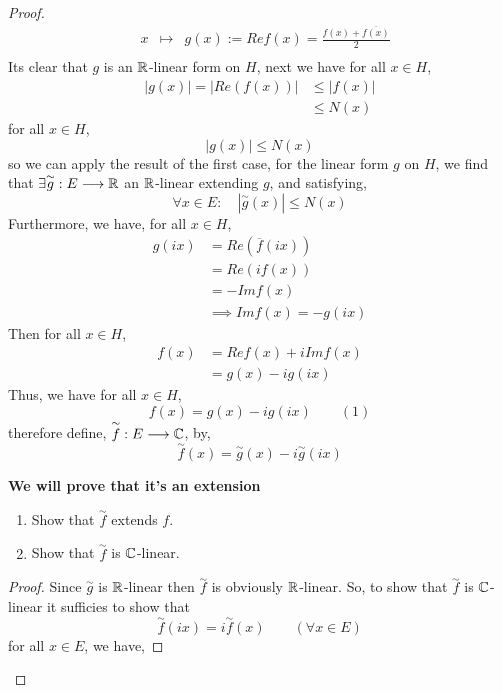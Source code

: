 \begin{proof}
\[\begin{array}{cccc}
           &  x  & \longmapsto     & g(x) := Re f(x) = \frac{f(x) + \overline{f(x) }}{2} \\ 
\end{array}
\]
Its clear that $g $ is an $\mathbb{R}  $-linear form on $H $, next we have for all 
$x \in  H $, 
\begin{align*}
	\left| g(x)  \right| =
	\left| Re(f(x) )  \right| & \leq 
\left| f(x)  \right| \\
				  & \leq 
				  N(x) 
\end{align*}
for all $x \in  H $, 
\[
	\left| g(x)  \right| \leq 
	N(x) 
\]
so we can apply the result of the first case, 
for the linear form $g $ on $H $, we find that 
$ \exists \overset{\sim}{g}  : E \longrightarrow \mathbb{R}  $ 
an $\mathbb{R}$-linear extending $g $, and satisfying, 
\[
\forall  x \in  E: \quad 
\left| \overset{\sim}{g} (x)  \right| \leq 
N(x) 
\]
Furthermore, we have, for all $x \in H$, 
\begin{align*}
	g(ix)  &= 
	Re ( \overline{f}(ix) )  \\
	       &=
	       Re (i f(x) )  \\
	       &= - Im f(x)  \\
	       & \implies 
	       Im f(x)  = - g(ix) 
\end{align*}
Then for all $x \in  H $, 
\begin{align*}
	f(x)  &= 
	Re f(x)  + i Imf(x)  \\
	      &= g(x) - i g(ix) 
\end{align*}
Thus, we have for all $x \in  H $, 
\[
f(x) = g(x) - i g(ix)  \quad \quad  (1) 
\]
therefore define,
$ \overset{\sim}{f}  : E \longrightarrow \mathbb{C}  $, by, 
\[
\overset{\sim}{f} (x)  = 
\overset{\sim}{g} (x)  - i \overset{\sim}{g} (ix) 
\]
\begin{center}
	\textbf{
	We will prove that it's an extension
	}
\end{center}
\begin{enumerate}[(1)]
\item Show that $\overset{\sim}{f}$ extends $f$. 
\item Show that $\overset{\sim}{f}  $ is $\mathbb{C}$-linear.
\end{enumerate}
\begin{proof}
Since $\overset{\sim}{g}  $  is $\mathbb{R}  $-linear then 
$\overset{\sim}{f}  $  is obviously $\mathbb{R}$-linear. So, to show that 
$\overset{\sim}{f}  $  is $\mathbb{C}$-linear it sufficies to show that 
\[
\overset{\sim}{f} (ix)  = i 
\overset{\sim}{f} (x)  \quad \quad  (\forall  x \in  E) 
\]
for all $x \in  E $, we have, 

\end{proof}
\end{proof}
